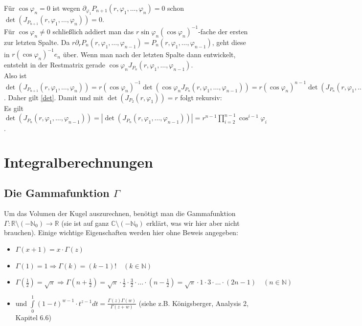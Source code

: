 \documentclass[a4paper,11pt]{scrartcl}
\newcommand{\R}{{\ensuremath{\mathbb{R}}}}
\newcommand{\N}{{\ensuremath{\mathbb{N}}}}
\newcommand{\C}{{\ensuremath{\mathbb{C}}}}
\begin{document}
Für $\cos\varphi_n=0$ ist wegen $\partial_{\varphi_1}P_{n+1}(r,\varphi_1,\ldots,\varphi_n)=0$ schon $\det(J_{P_{n+1}}(r,\varphi_1,\ldots,\varphi_n))=0$.\\
Für $\cos\varphi_n\neq 0$ schließlich addiert man das $r\sin\varphi_n(\cos\varphi_n)^{-1}$-fache der ersten zur letzten Spalte. Da $r\partial_r P_n(r,\varphi_1,\ldots,\varphi_{n-1})=P_n(r,\varphi_1,\ldots,\varphi_{n-1})$, geht diese in $r(\cos\varphi_n)^{-1}e_n$ über. Wenn man nach der letzten Spalte dann entwickelt, entsteht in der Restmatrix gerade $\cos\varphi_n J_{P_n}(r,\varphi_1,\ldots,\varphi_{n-1})$.\\
Also ist $\det(J_{P_{n+1}}(r,\varphi_1,\ldots,\varphi_n))=r(\cos\varphi_n)^{-1}\det(\cos\varphi_n J_{P_n}(r,\varphi_1,\ldots,\varphi_{n-1})) = r(\cos\varphi_n)^{n-1}\det(J_{P_n}(r,\varphi_1,\ldots,\varphi_{n-1}))$. Daher gilt \eqref{det}.
Damit und mit $\det(J_{P_2}(r, \varphi_1))=r$ folgt rekursiv:\\
Es gilt $\det(J_{P_n}(r,\varphi_1,\ldots,\varphi_{n-1}))=|\det(J_{P_n}(r,\varphi_1,\ldots,\varphi_{n-1}))|=r^{n-1}\prod\limits_{i=2}^{n-1}\cos^{i-1}\varphi_i$.
\section{Integralberechnungen}
\subsection{Die Gammafunktion $\Gamma$}
Um das Volumen der Kugel auszurechnen, benötigt man die Gammafunktion \\$\Gamma:\R\setminus(-\N_0)\to\R$ (sie ist auf ganz $\C\setminus(-\N_0)$ erklärt, was wir hier aber nicht brauchen). Einige wichtige Eigenschaften werden hier ohne Beweis angegeben:
\begin{itemize}
\item $\Gamma(x+1)=x\cdot\Gamma(z)$
\item $\Gamma(1)=1\Rightarrow\Gamma(k)=(k-1)!\quad (k\in\N)$
\item $\Gamma(\frac{1}{2})=\sqrt{\pi}\Rightarrow\Gamma(n+\frac{1}{2})=\sqrt{\pi}\cdot\frac{1}{2}\cdot\frac{3}{2}\cdot\ldots\cdot (n-\frac{1}{2})=\sqrt{\pi}\cdot 1\cdot 3\cdot\ldots\cdot (2n-1)\quad (n\in\N)$
\item und $\int\limits_0^1 (1-t)^{w-1}\cdot t^{z-1}dt=\frac{\Gamma(z)\Gamma(w)}{\Gamma(z+w)}$ (siehe z.B. Königsberger, Analysis 2, Kapitel 6.6)
\end{itemize}
\end{document}
